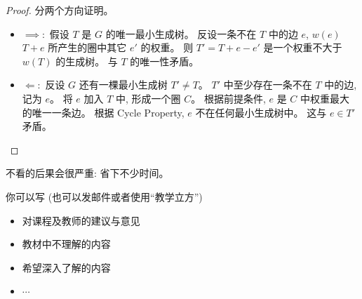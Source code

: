 \documentclass[a4paper, justified]{tufte-handout}
\begin{document}
\begin{proof}
  分两个方向证明。
  \begin{itemize}
    \item $\implies:$ 假设 $T$ 是 $G$ 的唯一最小生成树。
      反设一条不在 $T$ 中的边 $e$,
      $w(e)$  $T + e$ 所产生的圈中其它 $e'$ 的权重。
      则 $T' = T + e - e'$ 是一个权重不大于 $w(T)$ 的生成树。
      与 $T$ 的唯一性矛盾。
    \item $\Longleftarrow:$ 反设 $G$ 还有一棵最小生成树 $T' \neq T$。
      $T'$ 中至少存在一条不在 $T$ 中的边, 记为 $e$。
      将 $e$ 加入 $T$ 中, 形成一个圈 $C$。
      根据前提条件, $e$ 是 $C$ 中权重最大的唯一一条边。
      根据 Cycle Property, $e$ 不在任何最小生成树中。
      这与 $e \in T'$ 矛盾。
  \end{itemize}
\end{proof}

\begin{problem}[\score{$-10$}]
\end{problem}

\begin{solution}
  不看的后果会很严重: 省下不少时间。
\end{solution}


\begincorrection

\beginfb

你可以写 (也可以发邮件或者使用``教学立方'')
\begin{itemize}
  \item 对课程及教师的建议与意见
  \item 教材中不理解的内容
  \item 希望深入了解的内容
  \item $\cdots$
\end{itemize}
\end{document}
